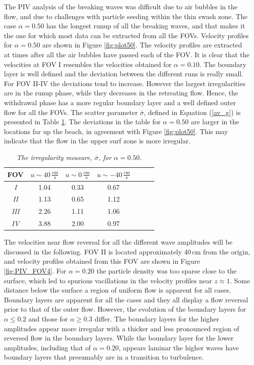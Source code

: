 \documentclass[review, authoryear]{elsarticle}
\newcommand{\cm}{\,\mbox{cm}}
\newcommand{\cmbps}{\,\frac{\mbox{cm}}{\mbox{s}}}
\begin{document}
The PIV analysis of the breaking waves was difficult due to air bubbles in the flow, and due to challenges with particle seeding within the thin swash zone.  The case $\alpha=0.50$ has the longest runup of all the breaking waves, and that makes it the one for which 
 most data can be extracted from all the FOVs. Velocity profiles for $\alpha=0.50$ are shown in Figure \ref{fig:plot50}. The velocity profiles are extracted at times after all the air bubbles have passed each of the FOV. It is clear that the velocities at FOV I resembles the velocities obtained for $\alpha=0.10$. The boundary layer is well defined and the deviation between the different runs is really small. For FOV II-IV the deviations tend to increase. However the largest irregularities are in the
 runup phase, while they decreases in the retreating flow. Hence, the withdrawal phase has a more regular boundary layer and a well defined outer flow for all the FOVs. The scatter parameter $\overline{\sigma}$, defined in Equation (\ref{av_g}) is presented in Table \ref{tab:irr}. 
The deviations in the table for $\alpha=0.50$ are larger in the locations far up the beach, in agreement with Figure \ref{fig:plot50}. This may indicate that 
the flow in the upper surf zone is more irregular.  


\begin{table}[]
\caption{\textit{The irregularity measure, $\overline{\sigma}$, for $\alpha=0.50$.}}
\centering
\begin{tabular}{ccccccc}
\hline
FOV& $  u\sim40\cmbps$  &$ u\sim 0\cmbps$ & $u\sim -40\cmbps$   \\ \hline
\textit{I}  & 1.04   &    0.33  & 0.67                       \\
\textit{II}  & 1.13   &    0.65   & 1.12                    \\
\textit{III} &  2.26   &    1.11 &  1.06                            \\
\textit{IV}  & 3.88    &   2.00  & 0.97                 \\
\end{tabular}
\label{tab:irr}
\end{table}



The velocities near flow reversal for all the different wave amplitudes will be discussed in the following. FOV II is located approximately $40\cm$ from the origin, and velocity 
profiles obtained from this FOV are shown in Figure \ref{fig:PIV_FOV4}.
For $\alpha=0.20$ the particle density was too sparse close to the surface, which led to spurious vacillations in the velocity profiles near  $z\approx1$. Some distance below the surface a region of uniform flow is apparent for all cases. 
Boundary layers are apparent for all the cases and they all
display a flow reversal prior to that of the outer flow.
However, the evolution of the boundary layers for 
$\alpha\le 0.2$ and those for $\alpha\ge 0.3$ differ.
The boundary layers for the higher amplitudes appear more irregular
with a thicker and less pronounced region of reversed flow in the 
boundary layers. 
While the boundary layer for the lower amplitudes, including that of $\alpha=0.20$, appears laminar the higher waves have boundary layers that 
presumably are in a transition to turbulence.   
\end{document}
